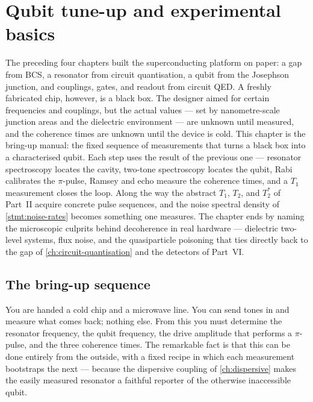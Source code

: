 \chapter{Qubit tune-up and experimental basics}
\label{ch:experimental-basics}

The preceding four chapters built the superconducting platform on
paper: a gap from BCS, a resonator from circuit quantisation, a qubit
from the Josephson junction, and couplings, gates, and readout from
circuit QED. A freshly fabricated chip, however, is a black box. The
designer aimed for certain frequencies and couplings, but the actual
values --- set by nanometre-scale junction areas and the dielectric
environment --- are unknown until measured, and the coherence times are
unknown until the device is cold. This chapter is the bring-up manual:
the fixed sequence of measurements that turns a black box into a
characterised qubit. Each step uses the result of the previous one ---
resonator spectroscopy locates the cavity, two-tone spectroscopy
locates the qubit, Rabi calibrates the $\pi$-pulse, Ramsey and echo
measure the coherence times, and a $T_1$ measurement closes the loop.
Along the way the abstract $T_1$, $T_2$, and $T_2^*$ of Part~II acquire
concrete pulse sequences, and the noise spectral density of
\cref{stmt:noise-rates} becomes something one measures. The chapter
ends by naming the microscopic culprits behind decoherence in real
hardware --- dielectric two-level systems, flux noise, and the
quasiparticle poisoning that ties directly back to the gap of
\cref{ch:circuit-quantisation} and the detectors of Part~VI.

\section{The bring-up sequence}
\label{sec:experimental-basics}

\begin{phenomenon}
You are handed a cold chip and a microwave line. You can send tones in
and measure what comes back; nothing else. From this you must determine
the resonator frequency, the qubit frequency, the drive amplitude that
performs a $\pi$-pulse, and the three coherence times. The remarkable
fact is that this can be done entirely from the outside, with a fixed
recipe in which each measurement bootstraps the next --- because the
dispersive coupling of \cref{ch:dispersive} makes the easily measured
resonator a faithful reporter of the otherwise inaccessible qubit.
\end{phenomenon}

